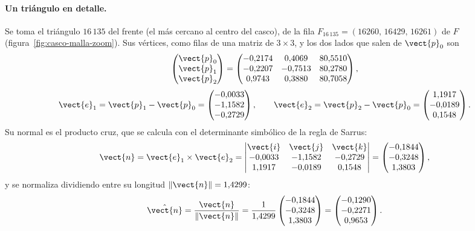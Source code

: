 \paragraph{Un triángulo en detalle.} Se toma el triángulo $16\,135$ del frente (el más cercano al centro del casco), de la fila $F_{16\,135}=( 16260,\,16429,\,16261 )$ de $F$
(figura~\ref{fig:casco-malla-zoom}). Sus vértices, como filas de una matriz de $3\times3$, y los dos lados que salen de $\vect{p}_0$ son
\begin{equation}
\begin{pmatrix}\vect{p}_0\\\vect{p}_1\\\vect{p}_2\end{pmatrix}=\begin{pmatrix} -0{,}2174 & 0{,}4069 & 80{,}5510 \\ -0{,}2207 & -0{,}7513 & 80{,}2780 \\ 0{,}9743 & 0{,}3880 & 80{,}7058 \end{pmatrix},
\end{equation}
\begin{equation}
\vect{e}_1=\vect{p}_1-\vect{p}_0=\begin{pmatrix} -0{,}0033 \\ -1{,}1582 \\ -0{,}2729 \end{pmatrix},\qquad \vect{e}_2=\vect{p}_2-\vect{p}_0=\begin{pmatrix} 1{,}1917 \\ -0{,}0189 \\ 0{,}1548 \end{pmatrix} .
\end{equation}
Su normal es el producto cruz, que se calcula con el determinante simbólico de la regla de Sarrus:
\begin{equation}
\vect{n}=\vect{e}_1\times\vect{e}_2=\begin{vmatrix}\vect{i}&\vect{j}&\vect{k}\\ -0{,}0033&-1{,}1582&-0{,}2729\\ 1{,}1917&-0{,}0189&0{,}1548\end{vmatrix}=\begin{pmatrix} -0{,}1844 \\ -0{,}3248 \\ 1{,}3803 \end{pmatrix},
\end{equation}
y se normaliza dividiendo entre su longitud $\lVert\vect{n}\rVert=1{,}4299$:
\begin{equation}
\hat{\vect{n}}=\frac{\vect{n}}{\lVert\vect{n}\rVert}=\frac{1}{1{,}4299}\begin{pmatrix} -0{,}1844 \\ -0{,}3248 \\ 1{,}3803 \end{pmatrix}=\begin{pmatrix} -0{,}1290 \\ -0{,}2271 \\ 0{,}9653 \end{pmatrix} .
\end{equation}
